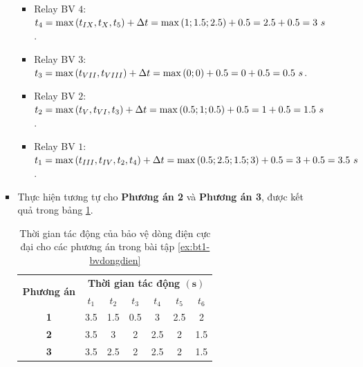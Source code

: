 \documentclass[12pt,a4paper]{article}
\begin{document}
\begin{enumerate}[1.]
\begin{enumerate}[\it a.]
\begin{itemize}
\begin{itemize}
								\item Relay BV $4$: $t_4 = \max\left({t_{IX}, t_{X}, t_{5}}\right) + \Delta t = \max\left({1; 1.5; 2.5}\right) + 0.5 = 2.5 + 0.5 = 3~s$.
								
								\item Relay BV $3$: $t_3 = \max\left({t_{VII}, t_{VIII}}\right) + \Delta t = \max\left({0; 0}\right) + 0.5 = 0 + 0.5 = 0.5~s$.
								
								\item Relay BV $2$: $t_2 = \max\left({t_{V}, t_{VI}, t_{3}}\right) + \Delta t = \max\left({0.5; 1; 0.5}\right) + 0.5 = 1 + 0.5 = 1.5~s$.
								
								\item Relay BV $1$: $t_1 = \max\left({t_{III}, t_{IV}, t_{2}, t_{4}}\right) + \Delta t = \max\left({0.5; 2.5; 1.5; 3}\right) + 0.5 = 3 + 0.5 = 3.5~s$.
							\end{itemize}
							
						\item Thực hiện tương tự cho \textbf{Phương án 2} và \textbf{Phương án 3}, được kết quả trong bảng \ref{Tab:bt1-bvdongdien-thoigian-tacdong-baove}.
						
							\begin{table}[!h]
								\begin{center}
									\begin{tabular}{|c|c|c|c|c|c|c|}\hline 
									\multirow{2}{2.3cm}{\textbf{Phương án}} & \multicolumn{6}{c|}{\textbf{Thời gian tác động $\mathbf{(s)}$}} \\ \cline{2-7} 
									 & $t_1$ & $t_2$ & $t_3$ & $t_4$ & $t_5$ & $t_6$ \\\hline 
									\textbf{1} & 3.5 & 1.5 & 0.5 & 3 & 2.5 & 2 \\ \hline 
									\textbf{2} & 3.5 & 3 & 2 & 2.5 & 2 & 1.5 \\ \hline 
									\textbf{3} & 3.5 & 2.5 & 2 & 2.5 & 2 & 1.5 \\ \hline 
									\end{tabular} 
								\end{center}
								\caption{Thời gian tác động của bảo vệ dòng điện cực đại cho các phương án trong bài tập \ref{ex:bt1-bvdongdien}} \label{Tab:bt1-bvdongdien-thoigian-tacdong-baove}
							\end{table}
					\end{itemize}


\end{enumerate}
\end{enumerate}
\end{document}
